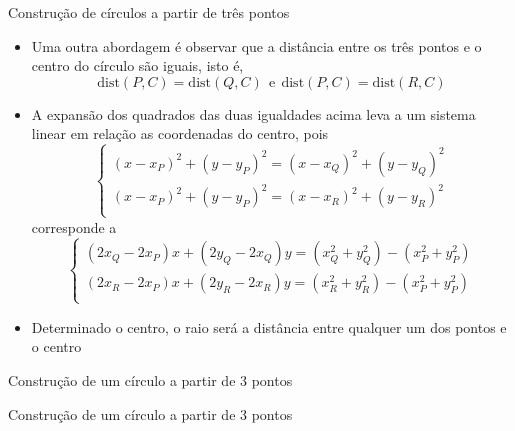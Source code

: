 \begin{frame}[fragile]{Construção de círculos a partir de três pontos}
    \begin{itemize}
        \item Uma outra abordagem é observar que a distância entre os três pontos e o centro do círculo são iguais, isto é, 
        \[\mathrm{dist}(P, C) = \mathrm{dist}(Q, C)\ \ \mbox{e}\ \ \mathrm{dist}(P, C) = \mathrm{dist}(R, C)
        \]

        \item A expansão dos quadrados das duas igualdades acima leva a um sistema linear em 
            relação as coordenadas do centro, pois
        \[
            \left\lbrace \begin{array}{l}
                (x - x_P)^2 + (y - y_P)^2 = (x - x_Q)^2 + (y - y_Q)^2 \\
                (x - x_P)^2 + (y - y_P)^2 = (x - x_R)^2 + (y - y_R)^2 \\
            \end{array}
            \right.
        \]
        corresponde a
        \[
            \left\lbrace \begin{array}{l}
                (2x_Q - 2x_P)x + (2y_Q - 2x_Q)y = (x_Q^2 + y_Q^2) - (x_P^2 + y_P^2) \\
                (2x_R - 2x_P)x + (2y_R - 2x_R)y = (x_R^2 + y_R^2) - (x_P^2 + y_P^2) \\
            \end{array}
            \right.
        \]

        \item Determinado o centro, o raio será a distância entre qualquer um dos pontos e o centro
    \end{itemize}

\end{frame}

\begin{frame}[fragile]{Construção de um círculo a partir de 3 pontos}
\end{frame}

\begin{frame}[fragile]{Construção de um círculo a partir de 3 pontos}
\end{frame}
